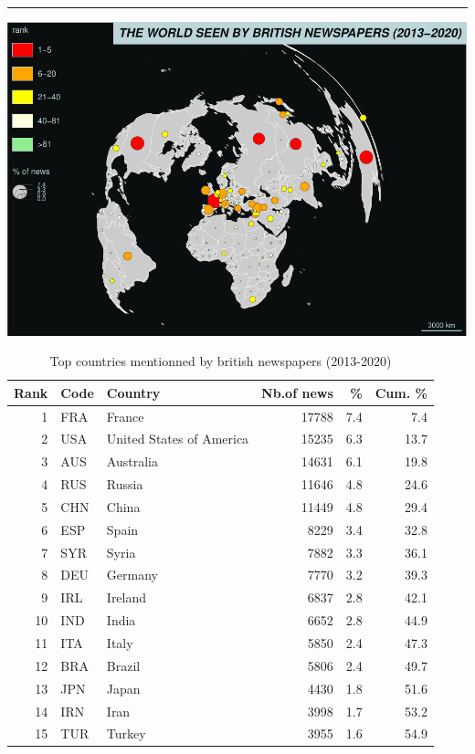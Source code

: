 \documentclass[
]{article}
\begin{document}
\begin{center}\rule{0.5\linewidth}{0.5pt}\end{center}

\includegraphics{Part2_maps_files/figure-latex/unnamed-chunk-9-1.pdf}

\begin{table}

\caption{\label{tab:unnamed-chunk-10}Top countries mentionned by british newspapers (2013-2020)}
\centering
\begin{tabular}[t]{r|l|l|r|r|r}
\hline
Rank & Code & Country & Nb.of news & \% & Cum. \%\\
\hline
1 & FRA & France & 17788 & 7.4 & 7.4\\
\hline
2 & USA & United States of America & 15235 & 6.3 & 13.7\\
\hline
3 & AUS & Australia & 14631 & 6.1 & 19.8\\
\hline
4 & RUS & Russia & 11646 & 4.8 & 24.6\\
\hline
5 & CHN & China & 11449 & 4.8 & 29.4\\
\hline
6 & ESP & Spain & 8229 & 3.4 & 32.8\\
\hline
7 & SYR & Syria & 7882 & 3.3 & 36.1\\
\hline
8 & DEU & Germany & 7770 & 3.2 & 39.3\\
\hline
9 & IRL & Ireland & 6837 & 2.8 & 42.1\\
\hline
10 & IND & India & 6652 & 2.8 & 44.9\\
\hline
11 & ITA & Italy & 5850 & 2.4 & 47.3\\
\hline
12 & BRA & Brazil & 5806 & 2.4 & 49.7\\
\hline
13 & JPN & Japan & 4430 & 1.8 & 51.6\\
\hline
14 & IRN & Iran & 3998 & 1.7 & 53.2\\
\hline
15 & TUR & Turkey & 3955 & 1.6 & 54.9\\
\hline
\end{tabular}
\end{table}
\end{document}
